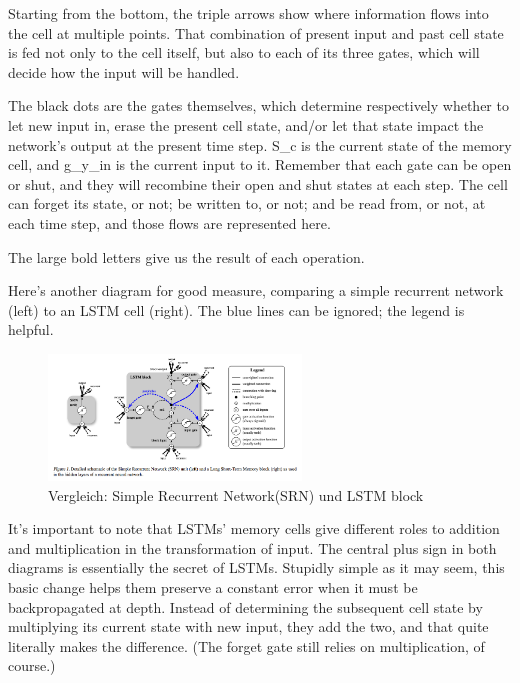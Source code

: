 {Starting from the bottom, the triple arrows show where information flows into the cell at multiple points. That combination of present input and past cell state is fed not only to the cell itself, but also to each of its three gates, which will decide how the input will be handled.

The black dots are the gates themselves, which determine respectively whether to let new input in, erase the present cell state, and/or let that state impact the network’s output at the present time step. S\_c is the current state of the memory cell, and g\_y\_in is the current input to it. Remember that each gate can be open or shut, and they will recombine their open and shut states at each step. The cell can forget its state, or not; be written to, or not; and be read from, or not, at each time step, and those flows are represented here.

The large bold letters give us the result of each operation.

Here’s another diagram for good measure, comparing a simple recurrent network (left) to an LSTM cell (right). The blue lines can be ignored; the legend is helpful.

\renewcommand{\figurename}{Abb.}
\begin{figure}[htp]
\centering
\includegraphics[width=0.60\textwidth]{pictures/greff_lstm_diagram.png}
\caption[Vergleich Recurrent Network und LSTM]{Vergleich: Simple Recurrent Network(SRN) und LSTM block\protect\footnotemark}
\end{figure}

It’s important to note that LSTMs’ memory cells give different roles to addition and multiplication in the transformation of input. The central plus sign in both diagrams is essentially the secret of LSTMs. Stupidly simple as it may seem, this basic change helps them preserve a constant error when it must be backpropagated at depth. Instead of determining the subsequent cell state by multiplying its current state with new input, they add the two, and that quite literally makes the difference. (The forget gate still relies on multiplication, of course.)

}

